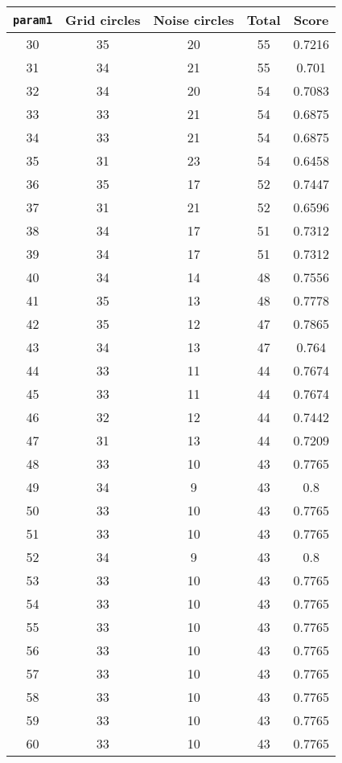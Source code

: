 \documentclass[letterpaper, 12pt]{article}
\begin{document}
\begin{longtable}{|c|c|c|c|c|}
\hline
\textbf{\texttt{param1}} & \textbf{Grid circles} & \textbf{Noise circles} & \textbf{Total} & \textbf{Score} \\
\hline
30 & 35 & 20 & 55 & 0.7216 \\
\hline
31 & 34 & 21 & 55 & 0.701 \\
\hline
32 & 34 & 20 & 54 & 0.7083 \\
\hline
33 & 33 & 21 & 54 & 0.6875 \\
\hline
34 & 33 & 21 & 54 & 0.6875 \\
\hline
35 & 31 & 23 & 54 & 0.6458 \\
\hline
36 & 35 & 17 & 52 & 0.7447 \\
\hline
37 & 31 & 21 & 52 & 0.6596 \\
\hline
38 & 34 & 17 & 51 & 0.7312 \\
\hline
39 & 34 & 17 & 51 & 0.7312 \\
\hline
40 & 34 & 14 & 48 & 0.7556 \\
\hline
41 & 35 & 13 & 48 & 0.7778 \\
\hline
42 & 35 & 12 & 47 & 0.7865 \\
\hline
43 & 34 & 13 & 47 & 0.764 \\
\hline
44 & 33 & 11 & 44 & 0.7674 \\
\hline
45 & 33 & 11 & 44 & 0.7674 \\
\hline
46 & 32 & 12 & 44 & 0.7442 \\
\hline
47 & 31 & 13 & 44 & 0.7209 \\
\hline
48 & 33 & 10 & 43 & 0.7765 \\
\hline
49 & 34 & 9 & 43 & 0.8 \\
\hline
50 & 33 & 10 & 43 & 0.7765 \\
\hline
51 & 33 & 10 & 43 & 0.7765 \\
\hline
52 & 34 & 9 & 43 & 0.8 \\
\hline
53 & 33 & 10 & 43 & 0.7765 \\
\hline
54 & 33 & 10 & 43 & 0.7765 \\
\hline
55 & 33 & 10 & 43 & 0.7765 \\
\hline
56 & 33 & 10 & 43 & 0.7765 \\
\hline
57 & 33 & 10 & 43 & 0.7765 \\
\hline
58 & 33 & 10 & 43 & 0.7765 \\
\hline
59 & 33 & 10 & 43 & 0.7765 \\
\hline
60 & 33 & 10 & 43 & 0.7765 \\

\end{longtable}
\end{document}
